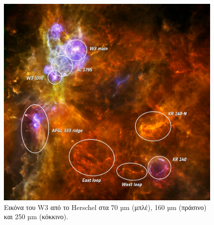 \documentclass[a4paper,12pt]{memoir}
\begin{document}
\begin{figure}[hb]
	\centering
	\includegraphics[width=13cm]{images/w3_70_160_250_annotated.jpg}
	\caption{Εικόνα του W3 από το Herschel στα 70 µm (μπλέ), 160 µm (πράσινο) και 250 µm (κόκκινο).}
\end{figure}


%

\end{document}
